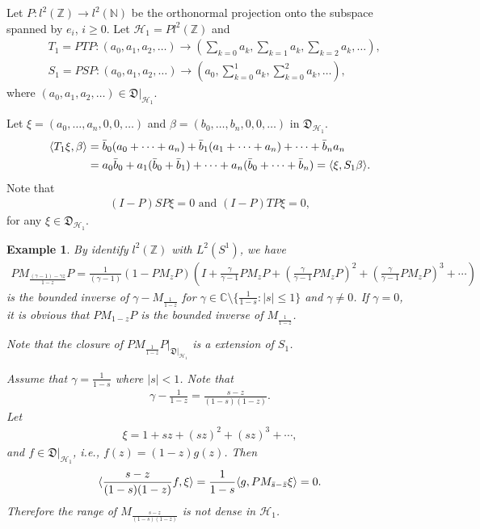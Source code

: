 \documentclass[a4paper,10pt]{amsart}
\newtheorem{example}{Example}[section]
\newcommand{\HHH}{\mathcal H} %
\newcommand{\DDD}{\mathfrak D}
\newcommand{\C}{\mathbb C} %
\newcommand{\Z}{\mathbb Z} %
\newcommand{\N}{\mathbb N} %
\begin{document}
Let $P: l^{2}(\Z) \to l^{2}(\N)$ be the orthonormal projection onto
the subspace spanned by $e_i$, $i \geq 0$.
Let $\HHH_{1} = Pl^{2}(\Z)$ and 
\begin{align*}
    &T_1 = PTP : (a_0, a_1, a_2, \ldots ) \to (\sum_{k=0}a_k,\sum_{k=1}a_k,
    \sum_{k=2}a_k, \ldots), \\
    &S_1 = PSP : (a_0, a_1, a_2, \ldots ) \to (a_0,\sum_{k=0}^{1}a_k,
    \sum_{k=0}^{2}a_k, \ldots),
\end{align*}
where $(a_0, a_1, a_2, \ldots) \in \DDD|_{\HHH_1}$.

Let $\xi = (a_0, \ldots, a_n, 0, 0, \ldots)$ 
and $\beta = (b_0, \ldots, b_n, 0, 0, \ldots)$ in $\DDD_{\HHH_1}$.
\begin{align*}
    \langle T_1 \xi, \beta \rangle &= \Bar{b}_{0}(a_0 + \cdots + a_n)
    + \Bar{b}_{1}(a_1 + \cdots + a_n) + \cdots + \Bar{b}_{n}a_n \\
    & = a_{0}\Bar{b}_{0} + a_{1}(\Bar{b}_{0} + \Bar{b}_{1}) + \cdots + 
    a_{n}(\Bar{b}_{0} + \cdots + \Bar{b}_{n}) = 
    \langle \xi, S_1 \beta \rangle.
\end{align*}
Note that 
\begin{align*}
    (I-P)SP\xi = 0 \mbox{ and } (I-P)TP \xi = 0, 
\end{align*} 
for any $\xi \in \DDD_{\HHH_1}$.


\begin{example}
    By identify $l^2(\Z)$ with $L^{2}(S^1)$, we have
    \begin{align*}
        PM_{\frac{(\gamma -1)-\gamma z}{1-z}}P = 
        \frac{1}{(\gamma -1)}(1-PM_{z}P)(I + \frac{\gamma}{\gamma-1}PM_{z}P
        + (\frac{\gamma}{\gamma-1}PM_{z}P)^{2} 
        + (\frac{\gamma}{\gamma-1}PM_{z}P)^{3}
        + \cdots)     
    \end{align*}
    is the bounded inverse of $\gamma - M_{\frac{1}{1-z}}$ 
    for $\gamma \in \C \setminus \{\frac{1}{1-s} : |s| \leq 1 \}$ 
    and $\gamma \neq 0$.
    If $\gamma = 0$, it is obvious that $PM_{1-z}P$ is the bounded 
    inverse of $M_{\frac{1}{1-z}}$.
    
    Note that the closure of $PM_{\frac{1}{1-z}}P|_{\DDD|_{\HHH_1}}$
    is a extension of $S_1$.

    Assume that $\gamma = \frac{1}{1-s}$ where $|s| < 1$. Note that
    \begin{align*}
        \gamma - \frac{1}{1-z} = \frac{s-z}{(1-s)(1-z)}. 
    \end{align*}
    Let
    \begin{align*}
        \xi = 1 + sz + (sz)^2 + (sz)^3 + \cdots, 
    \end{align*} 
    and $f \in \DDD|_{\HHH_1}$, i.e., $f(z) = (1-z)g(z)$. Then
    \begin{align*}
       \langle  \frac{s-z}{(1-s)(1-z)} f, \xi \rangle = 
       \frac{1}{1-s}\langle g, PM_{\Bar{s} - \Bar{z}} \xi \rangle = 0.   
    \end{align*}
    Therefore the range of $M_{\frac{s-z}{(1-s)(1-z)}}$ 
    is not dense in $\HHH_1$.
\end{example}
\end{document}
